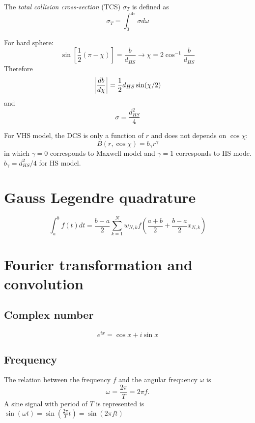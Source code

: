 \documentclass[11pt]{amsart}
\begin{document}
The \emph{total collision cross-section} (TCS) $\sigma_T$ is defined as
\begin{equation}
\sigma_T = \int_0^{4\pi} \sigma d\omega
\end{equation}

For hard sphere:
\begin{equation}
\sin\left[\frac{1}{2}(\pi - \chi)\right]=\frac{b}{d_{HS}} \to  \chi = 2\cos^{-1}\frac{b}{d_{HS}}
\end{equation}
Therefore
\begin{equation}
\left| {db\over d\chi} \right| = {1\over 2}d_{HS}\sin(\chi/2)
\end{equation}
and
\begin{equation}
\sigma = \frac{d_{HS}^2}{4}
\end{equation}

For VHS model, the DCS is only a function of $r$ and does not depends on $\cos \chi$:
\begin{equation}
 {B}(r,\cos\chi) =  b_\gamma r^\gamma
\end{equation}
in which $\gamma = 0$ corresponds to Maxwell model and $\gamma = 1$ corresponds to HS mode. $b_\gamma = d_{HS}^2/4$ for HS model.


\section{Gauss Legendre quadrature}
\begin{equation}
\int_{a}^{b} f(t) d t=\frac{b-a}{2} \sum_{k=1}^{N} w_{N, k} f\left(\frac{a+b}{2}+\frac{b-a}{2} x_{N, k}\right)
\end{equation}

\section{Fourier transformation and convolution}

\subsection{Complex number}
\begin{equation}
e^{ix} = \cos x + i \sin x
\end{equation}

\subsection{Frequency}
The relation between the frequency $f$ and the angular frequency  $\omega$ is
\begin{equation}
\omega=\frac{2 \pi}{T}=2 \pi f.
\end{equation}
A sine signal with period of $T$  is represented is $\sin(\omega t) = \sin(\frac{2\pi}{T}t) = \sin(2\pi f t) $
\end{document}
